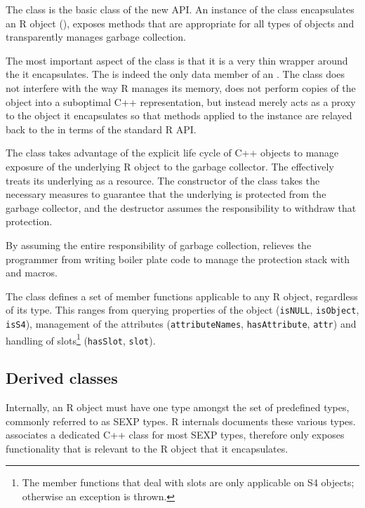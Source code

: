 The  class is the basic class of the new  API. 
An instance of the  class encapsulates an R object
(), exposes methods that are appropriate for all types 
of objects and transparently manages garbage collection.

The most important aspect of the  class is that it is 
a very thin wrapper around the  it encapsulates. The 
 is indeed the only data member of an . The 
 class does not interfere with the way R manages its 
memory, does not perform copies of the object into a suboptimal 
C++ representation, but instead merely acts as a proxy to the 
object it encapsulates so that methods applied to the 
instance are relayed back to the  in terms of the standard
R API.

The  class takes advantage of the explicit life cycle of 
C++ objects to manage exposure of the underlying R object to the 
garbage collector. The  effectively treats 
its underlying  as a resource.
The constructor of the  class takes 
the necessary measures to guarantee that the underlying 
is protected from the garbage collector, and the destructor
assumes the responsibility to withdraw that protection. 

By assuming the entire responsibility of garbage collection, 
relieves the programmer from writing boiler plate code to manage
the protection stack with  and  macros.

The  class defines a set of member functions applicable
to any R object, regardless of its type. This ranges from 
querying properties of the object (\texttt{isNULL}, \texttt{isObject}, 
\texttt{isS4}), management of the attributes 
(\texttt{attributeNames}, \texttt{hasAttribute}, \texttt{attr}) and 
handling of slots\footnote{The member functions that deal with slots
are only applicable on S4 objects; otherwise an exception is thrown.} 
(\texttt{hasSlot}, \texttt{slot}).

\subsection{Derived classes}

Internally, an R object must have one type amongst the set of 
predefined types, commonly referred to as SEXP types. R internals
\citep{R:ints} documents these various types. 
 associates a dedicated C++ class for most SEXP types, 
therefore only exposes functionality that is relevant to the R object
that it encapsulates.

